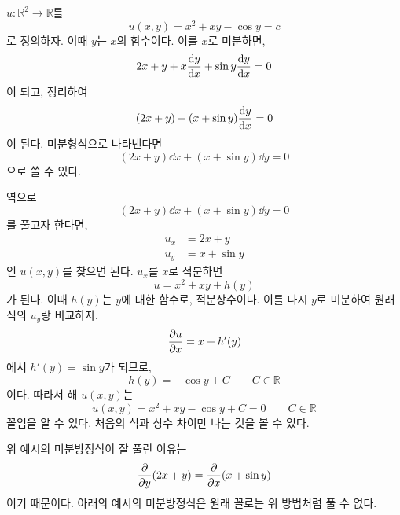 \documentclass[../engineering_mathematics_lecture_note.tex]{subfiles}
\begin{document}
\begin{example}
    $u: \mathbb R^2 \rightarrow \mathbb R$를
    \begin{equation*}
        u(x, y) = x^2 + xy - \cos y = c
    \end{equation*}
    로 정의하자.
    이때 $y$는 $x$의 함수이다.
    이를 $x$로 미분하면,
    \begin{equation*}
        2x + y + x \dv{y}{x} + \sin y \dv{y}{x} = 0
    \end{equation*}
    이 되고, 정리하여
    \begin{equation*}
        (2x + y) + (x + \sin y) \dv{y}{x} = 0
    \end{equation*}
    이 된다.
    미분형식으로 나타낸다면
    \begin{equation*}
        (2x + y) \dd{x} + (x + \sin y) \dd{y} = 0
    \end{equation*}
    으로 쓸 수 있다.

    역으로
    \begin{equation*}
        (2x + y) \dd{x} + (x + \sin y) \dd{y} = 0
    \end{equation*}
    를 풀고자 한다면,
    \begin{align*}
        u_x &= 2x + y\\
        u_y &= x + \sin y
    \end{align*}
    인 $u(x, y)$를 찾으면 된다.
    $u_x$를 $x$로 적분하면
    \begin{equation*}
        u = x^2 + xy + h(y)
    \end{equation*}
    가 된다.
    이때 $h(y)$는 $y$에 대한 함수로, 적분상수이다.
    이를 다시 $y$로 미분하여 원래 식의 $u_y$랑 비교하자.
    \begin{equation*}
        \pdv{u}{x} = x + h'(y)
    \end{equation*}
    에서 $h'(y) = \sin y$가 되므로,
    \begin{equation*}
        h(y) = -\cos y + C \qquad C \in \mathbb R
    \end{equation*}
    이다.
    따라서 해 $u(x, y)$는
    \begin{equation*}
        u(x, y) = x^2 + xy - \cos y + C = 0 \qquad C \in \mathbb R
    \end{equation*}
    꼴임을 알 수 있다.
    처음의 식과 상수 차이만 나는 것을 볼 수 있다.
\end{example}

위 예시의 미분방정식이 잘 풀린 이유는
\begin{equation*}
    \pdv{y}(2x + y) = \pdv{x}(x + \sin y)
\end{equation*}
이기 때문이다.
아래의 예시의 미분방정식은 원래 꼴로는 위 방법처럼 풀 수 없다.
\end{document}

